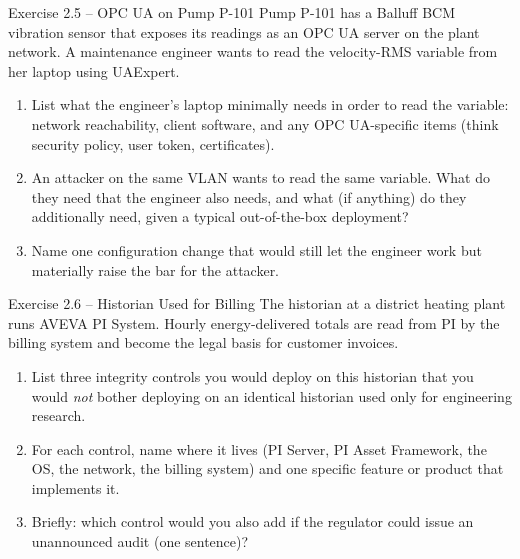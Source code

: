\documentclass[11pt,a4paper]{article}
\begin{document}
\begin{taskbox}{Exercise 2.5 -- OPC UA on Pump P-101}
Pump P-101 has a Balluff BCM vibration sensor that exposes its readings as
an OPC UA server on the plant network. A maintenance engineer wants to
read the velocity-RMS variable from her laptop using UAExpert.
\begin{enumerate}
  \item List what the engineer's laptop minimally needs in order to read the
    variable: network reachability, client software, and any
    OPC UA-specific items (think security policy, user token,
    certificates).
  \item An attacker on the same VLAN wants to read the same variable. What
    do they need that the engineer also needs, and what (if anything) do
    they additionally need, given a typical out-of-the-box deployment?
  \item Name one configuration change that would still let the engineer
    work but materially raise the bar for the attacker.
\end{enumerate}
\end{taskbox}

\begin{taskbox}{Exercise 2.6 -- Historian Used for Billing}
The historian at a district heating plant runs AVEVA PI System. Hourly
energy-delivered totals are read from PI by the billing system and become
the legal basis for customer invoices.
\begin{enumerate}
  \item List three integrity controls you would deploy on this historian
    that you would \emph{not} bother deploying on an identical historian
    used only for engineering research.
  \item For each control, name where it lives (PI Server, PI Asset
    Framework, the OS, the network, the billing system) and one specific
    feature or product that implements it.
  \item Briefly: which control would you also add if the regulator could
    issue an unannounced audit (one sentence)?
\end{enumerate}
\end{taskbox}
\end{document}

